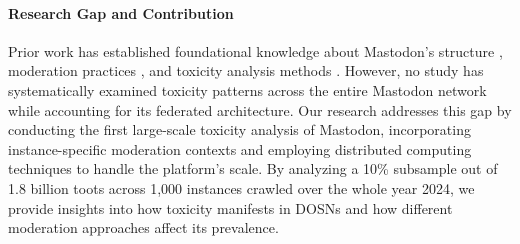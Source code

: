 \paragraph{Research Gap and Contribution}
Prior work has established foundational knowledge about Mastodon's structure \cite{zulli:2020,la_cava:2021}, moderation practices \cite{bono:2024,nicholson:2023}, and toxicity analysis methods \cite{fan:2022}. However, no study has systematically examined toxicity patterns across the entire Mastodon network while accounting for its federated architecture. Our research addresses this gap by conducting the first large-scale toxicity analysis of Mastodon, incorporating instance-specific moderation contexts and employing distributed computing techniques to handle the platform's scale. By analyzing a 10\% subsample out of 1.8 billion toots across 1,000 instances crawled over the whole year 2024, we provide insights into how toxicity manifests in DOSNs and how different moderation approaches affect its prevalence.